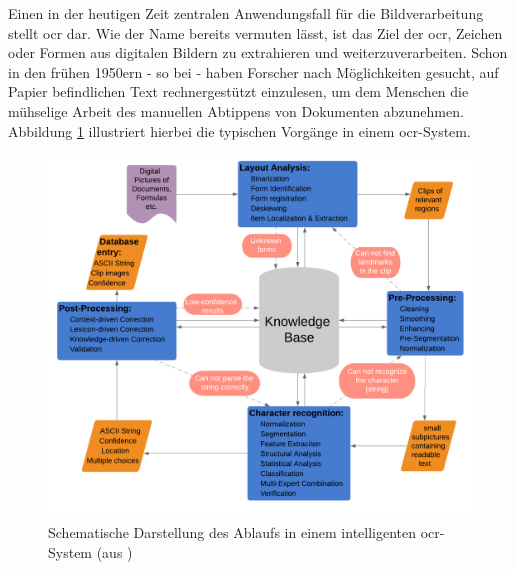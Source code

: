 	Einen in der heutigen Zeit zentralen Anwendungsfall für die Bildverarbeitung stellt \gls{ocr} dar. Wie der Name bereits vermuten lässt, ist das Ziel der \gls{ocr}, Zeichen oder Formen aus digitalen Bildern zu extrahieren und weiterzuverarbeiten. Schon in den frühen 1950ern - so bei \cite{cher-et-al-ocr} - haben Forscher nach Möglichkeiten gesucht, auf Papier befindlichen Text rechnergestützt einzulesen, um dem Menschen die mühselige Arbeit des manuellen Abtippens von Dokumenten abzunehmen. Abbildung \ref{fig:ocr-system} illustriert hierbei die typischen Vorgänge in einem \gls{ocr}-System. 
	
	\begin{figure}[H]
		\centering
		\includegraphics[width=0.7\linewidth]{Ablauf-OCR_Cheriet-et-al}
		\caption[typisches \gls{ocr}-Ablaufschema]{Schematische Darstellung des Ablaufs in einem intelligenten \gls{ocr}-System (aus \cite{cher-et-al-ocr})}
		\label{fig:ocr-system}
	\end{figure}

	